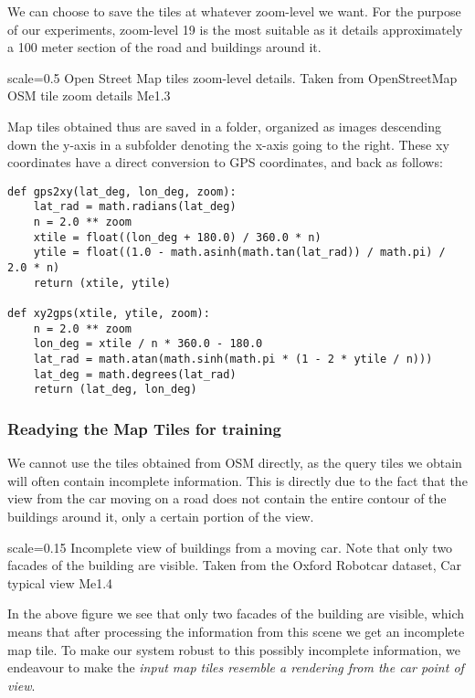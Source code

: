 We can choose to save the tiles at whatever zoom-level we want. For the purpose of our experiments, zoom-level 19 is the most suitable as it details approximately a 100 meter section of the road and buildings around it.

{scale=0.5}%
{Open Street Map tiles zoom-level details. Taken from OpenStreetMap}%
{OSM tile zoom details}%
{Me1.3}

Map tiles obtained thus are saved in a folder, organized as images descending down the y-axis in a subfolder denoting the x-axis going to the right. These xy coordinates have a direct conversion to GPS coordinates, and back as follows:

\begin{verbatim}
def gps2xy(lat_deg, lon_deg, zoom):
    lat_rad = math.radians(lat_deg)
    n = 2.0 ** zoom
    xtile = float((lon_deg + 180.0) / 360.0 * n)
    ytile = float((1.0 - math.asinh(math.tan(lat_rad)) / math.pi) / 2.0 * n)
    return (xtile, ytile)

def xy2gps(xtile, ytile, zoom):
    n = 2.0 ** zoom
    lon_deg = xtile / n * 360.0 - 180.0
    lat_rad = math.atan(math.sinh(math.pi * (1 - 2 * ytile / n)))
    lat_deg = math.degrees(lat_rad)
    return (lat_deg, lon_deg)
\end{verbatim}

\subsubsection{Readying the Map Tiles for training}
We cannot use the tiles obtained from OSM directly, as the query tiles we obtain will often contain incomplete information. This is directly due to the fact that the view from the car moving on a road does not contain the entire contour of the buildings around it, only a certain portion of the view. 

{scale=0.15}%
{Incomplete view of buildings from a moving car. Note that only two facades of the building are visible. Taken from the Oxford Robotcar dataset,  \cite{newman2017}}%
{Car typical view}%
{Me1.4}

In the above figure we see that only two facades of the building are visible, which means that after processing the information from this scene we get an incomplete map tile. To make our system robust to this possibly incomplete information, we endeavour to make the  \textit{input map tiles resemble a rendering from the car point of view}.

